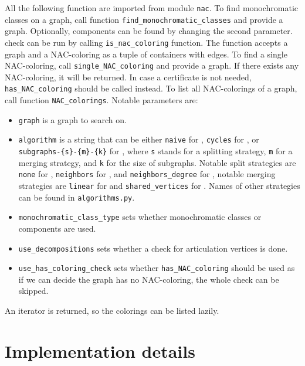 All the following function are imported from module \texttt{nac}.
To find monochromatic classes on a graph,
call function \texttt{find\_monochromatic\_classes} and provide a graph.
Optionally, \trcon{} components can be found by changing the second parameter.
%
\IsNACColoring{} check can be run by calling \texttt{is\_nac\_coloring} function.
The function accepts a graph and a NAC-coloring
as a tuple of containers with edges.
%
To find a single NAC-coloring, call \texttt{single\_NAC\_coloring} and provide
a graph. If there exists any NAC-coloring, it will be returned.
In case a certificate is not needed,
\texttt{has\_NAC\_coloring} should be called instead.
%
To list all NAC-colorings of a graph, call function \texttt{NAC\_colorings}.
Notable parameters are:
\begin{itemize}
	\item \texttt{graph} is a graph to search on.
	\item \texttt{algorithm} is a string that can be either
	      \texttt{naive} for \Naive{},
	      \texttt{cycles} for \NaiveCycles{},
	      or \texttt{subgraphs-\{s\}-\{m\}-\{k\}} for \Subgraphs{},
	      where \texttt{s} stands for a splitting strategy,
	      \texttt{m} for a merging strategy,
	      and \texttt{k} for the size of subgraphs.
	      Notable split strategies are
	      \texttt{none} for \None{},
	      \texttt{neighbors} for \Neighbors{}, and
	      \texttt{neighbors\_degree} for \NeighborsDegree{},
	      notable merging strategies are
	      \texttt{linear} for \MergeLinear{} and
	      \texttt{shared\_vertices} for \SharedVertices{}.
	      Names of other strategies can be found in \texttt{algorithms.py}.
	\item \texttt{monochromatic\_class\_type} sets
	      whether monochromatic classes or \trcon{} components are used.
	\item \texttt{use\_decompositions} sets
	      whether a check for articulation vertices is done.
	\item \texttt{use\_has\_coloring\_check} sets
	      whether \texttt{has\_NAC\_coloring} should be used
	      as if we can decide the graph has no NAC-coloring,
	      the whole check can be skipped.
\end{itemize}
%
An iterator is returned, so the colorings can be listed lazily.


\section{Implementation details}

